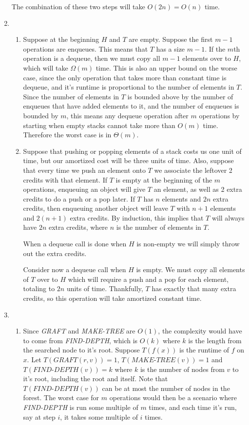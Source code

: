 \documentclass[letterpaper,10pt]{article}
\begin{document}
\begin{enumerate}
  The combination of these two steps will take $O(2n) = O(n)$ time.

  \clearpage
  \item

  \begin{enumerate}
    \item Suppose at the beginning $H$ and $T$ are empty. Suppose the first $m-1$ operations are enqueues. This means that $T$ has a size $m-1$. If the $m$th operation is a dequeue, then we must copy all $m-1$ elements over to $H$, which will take $\Omega(m)$ time. This is also an upper bound on the worse case, since the only operation that takes more than constant time is dequeue, and it's runtime is proportional to the number of elements in $T$. Since the number of elements in $T$ is bounded above by the number of enqueues that have added elements to it, and the number of enqueues is bounded by $m$, this means any dequeue operation after $m$ operations by starting when empty stacks cannot take more than $O(m)$ time. Therefore the worst case is in $\Theta(m)$.
    \item Suppose that pushing or popping elements of a stack costs us one unit of time, but our amortized cost will be three units of time. Also, suppose that every time we push an element onto $T$ we associate the leftover 2 credits with that element. If $T$ is empty at the beginning of the $m$ operations, enqueuing an object will give $T$ an element, as well as 2 extra credits to do a push or a pop later. If $T$ has $n$ elements and $2n$ extra credits, then enqueuing another object will leave $T$ with $n+1$ elements and $2(n+1)$ extra credits. By induction, this implies that $T$ will always have $2n$ extra credits, where $n$ is the number of elements in $T$.
    
    When a dequeue call is done when $H$ is non-empty we will simply throw out the extra credits.
    
    Consider now a dequeue call when $H$ is empty. We must copy all elements of $T$ over to $H$ which will require a push and a pop for each element, totaling to $2n$ units of time. Thankfully, $T$ has exactly that many extra credits, so this operation will take amortized constant time. 
  \end{enumerate}

  \clearpage
  \item

  \begin{enumerate}
    \item Since \textit{GRAFT} and \textit{MAKE-TREE} are $O(1)$, the complexity would have to come from \textit{FIND-DEPTH}, which is $O(k)$ where $k$ is the length from the searched node to it's root. Suppose $T(f(x))$ is the runtime of $f$ on $x$. Let $T(\textit{GRAFT}(r, v)) = 1$, $T(\textit{MAKE-TREE}(v)) = 1$ and $T(\textit{FIND-DEPTH}(v)) = k$ where $k$ is the number of nodes from $v$ to it's root, including the root and itself. Note that $T(\textit{FIND-DEPTH}(v))$ can be at most the number of nodes in the forest. The worst case for $m$ operations would then be a scenario where \textit{FIND-DEPTH} is run some multiple of $m$ times, and each time it's run, say at step $i$, it takes some multiple of $i$ times. 


\end{enumerate}
\end{enumerate}
\end{document}
